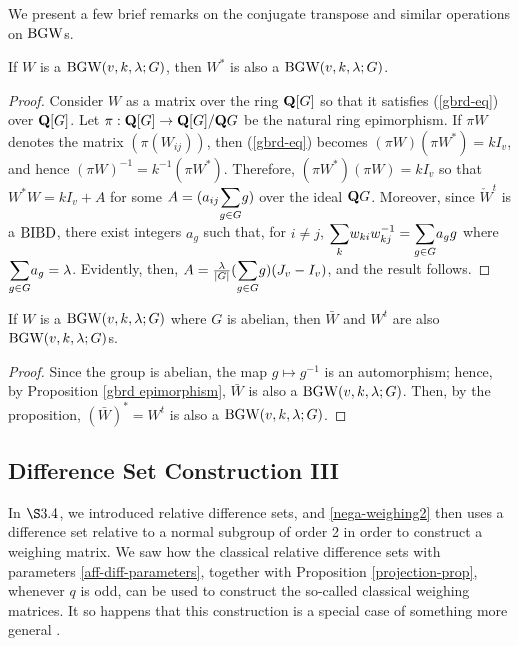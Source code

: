 \documentclass[../../../main]{subfiles}
\begin{document}
 We present a few brief remarks on the conjugate transpose and similar operations on $\text{BGW}$s.
 
 \begin{prop}\label{bgw-conj-trans-prop}
  If $W$ is a $\text{BGW}(v,k,\lambda;G)$, then $W^*$ is also a $\text{BGW}(v,k,\lambda;G)$.
 \end{prop}

 \begin{proof}
  Consider $W$ as a matrix over the ring $\mathbf{Q}[G]$ so that it satisfies (\ref{gbrd-eq}) over $\mathbf{Q}[G]$. Let $\pi: \mathbf{Q}[G] \rightarrow \mathbf{Q} [G]/\mathbf{Q} G$ be the natural ring epimorphism. If $\pi W$ denotes the matrix $(\pi(W_{ij}))$, then (\ref{gbrd-eq}) becomes $(\pi W)(\pi W^*) = kI_v$, and hence $(\pi W)^{-1} = k^{-1}(\pi W^*)$. Therefore, $(\pi W^*)(\pi W) = kI_v$ so that $W^*W = kI_v + A$ for some $A = (a_{ij}\ssum_{g \in G}g)$ over the ideal $\mathbf{Q} G$. Moreover, since $\check W^t$ is a $\text{BIBD}$, there exist integers $a_g$ such that, for $i \neq j$, $\ssum_k w_{ki}w_{kj}^{-1} = \ssum_{g \in G}a_gg$ where $\ssum_{g \in G}a_g = \lambda$. Evidently, then, $A = \frac{\lambda}{|G|}(\ssum_{g \in G}g)(J_v - I_v)$, and the result follows.
 \end{proof}
 
 \begin{cor}
  If $W$ is a $\text{BGW}(v,k,\lambda;G)$ where $G$ is abelian, then $\bar W$ and $W^t$ are also $\text{BGW}(v,k,\lambda;G)$s.
 \end{cor}

 \begin{proof}
  Since the group is abelian, the map $g \mapsto g^{-1}$ is an automorphism; hence, by Proposition \ref{gbrd epimorphism}, $\bar W$ is also a $\text{BGW}(v,k,\lambda;G)$. Then, by the proposition, $(\bar W)^* = W^t$ is also a $\text{BGW}(v,k,\lambda;G)$.
 \end{proof}
 
 \dinkus
 
 \subsection{Difference Set Construction III}
 
 In $\S3.4$, we introduced relative difference sets, and \ref{nega-weighing2} then uses a difference set relative to a normal subgroup of order 2 in order to construct a weighing matrix. We saw how the classical relative difference sets with parameters \ref{aff-diff-parameters}, together with Proposition \ref{projection-prop}, whenever $q$ is odd, can be used to construct the so-called classical weighing matrices. It so happens that this construction is a special case of something more general \cite[see][Theorem 10.3.1]{combinatorics-of-symmetric-designs}.
 
\end{document}
